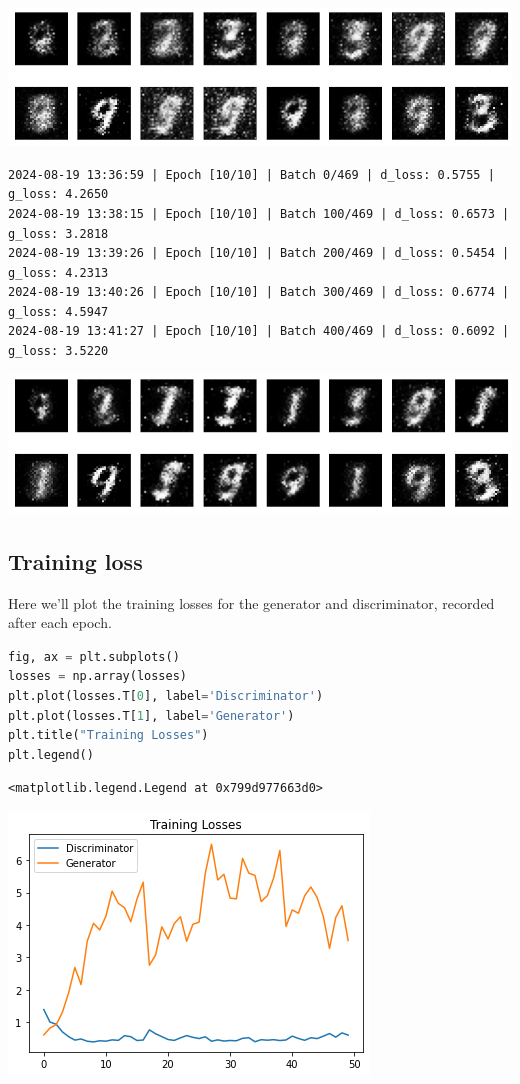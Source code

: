 \includegraphics{img/genAdvNet/gan/output_24_17.png}

\begin{lstlisting}
2024-08-19 13:36:59 | Epoch [10/10] | Batch 0/469 | d_loss: 0.5755 | g_loss: 4.2650
2024-08-19 13:38:15 | Epoch [10/10] | Batch 100/469 | d_loss: 0.6573 | g_loss: 3.2818
2024-08-19 13:39:26 | Epoch [10/10] | Batch 200/469 | d_loss: 0.5454 | g_loss: 4.2313
2024-08-19 13:40:26 | Epoch [10/10] | Batch 300/469 | d_loss: 0.6774 | g_loss: 4.5947
2024-08-19 13:41:27 | Epoch [10/10] | Batch 400/469 | d_loss: 0.6092 | g_loss: 3.5220
\end{lstlisting}

\includegraphics{img/genAdvNet/gan/output_24_19.png}

\subsection{Training loss}

Here we'll plot the training losses for the generator and discriminator,
recorded after each epoch.

\begin{lstlisting}[language=Python]
fig, ax = plt.subplots()
losses = np.array(losses)
plt.plot(losses.T[0], label='Discriminator')
plt.plot(losses.T[1], label='Generator')
plt.title("Training Losses")
plt.legend()
\end{lstlisting}

\begin{lstlisting}
<matplotlib.legend.Legend at 0x799d977663d0>
\end{lstlisting}

\includegraphics{img/genAdvNet/gan/output_26_1.png}

